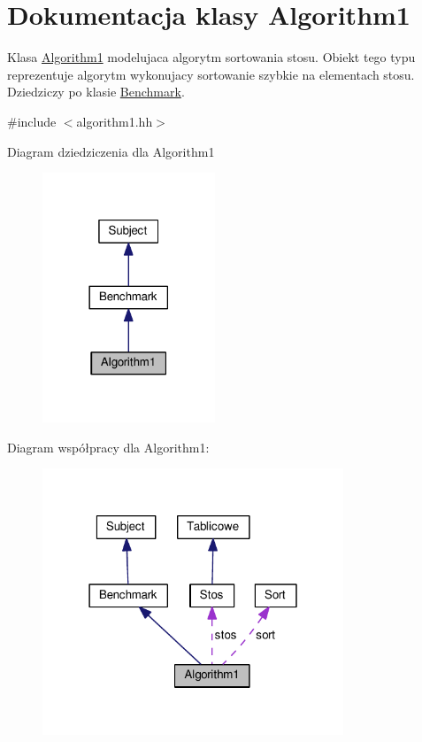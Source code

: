 \hypertarget{class_algorithm1}{\section{Dokumentacja klasy Algorithm1}
\label{class_algorithm1}
}


Klasa \hyperlink{class_algorithm1}{Algorithm1} modelujaca algorytm sortowania stosu. Obiekt tego typu reprezentuje algorytm wykonujacy sortowanie szybkie na elementach stosu. Dziedziczy po klasie \hyperlink{class_benchmark}{Benchmark}.  




{\ttfamily \#include $<$algorithm1.\-hh$>$}



Diagram dziedziczenia dla Algorithm1\nopagebreak
\begin{figure}[H]
\begin{center}
\leavevmode
\includegraphics[width=146pt]{class_algorithm1__inherit__graph}
\end{center}
\end{figure}


Diagram współpracy dla Algorithm1\-:\nopagebreak
\begin{figure}[H]
\begin{center}
\leavevmode
\includegraphics[width=255pt]{class_algorithm1__coll__graph}
\end{center}
\end{figure}
